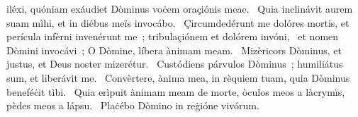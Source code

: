 \psalmChapterWithInscription{}
{ }
{%
iléxi, quóniam exáudiet Dòminus voċem oraçiónis meae. 
~Quia inclinávit aurem suam mìhi, et in diébus meïs invocábo. 
~Çircumdedérunt me dolóres mortis, et perícula infèrni invenérunt me~; tribulaçiónem et dolórem invóni, 
~et nomen Dòmini invocávi~; O Dòmine, líbera ànimam meam. 
~Mizèricors Dòminus, et justus, et Deus noster mizerétur. 
~Custódiens párvulos Dòminus~; humiliátus sum, et liberávit me. 
~Convèrtere, ànima mea, in rèquiem tuam, quia Dòminus beneféċit tìbi. 
~Quia erìpuit ànimam meam de morte, òculos meos a làcrymïs, pèdes meos a lápsu. 
~Plaċébo Dòmino in reġióne vivórum. 
}
